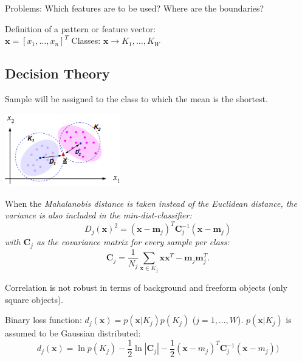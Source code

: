   \begin{minipage}{8cm}
    Problems: Which features are to be used? Where are the boundaries?
    
    Definition of a pattern or feature vector: \\
    $\bm x = [x_1, \ldots, x_n]^T$
    Classes: $\bm x \rightarrow K_1, \ldots, K_W$
  
    \subsection{Decision Theory}
        
        Sample will be assigned to the class to which the mean is the shortest. 
        
        \includegraphics[width=5cm]{./images/minimum_distance_classifier.png}
        
        When the \em Mahalanobis distance \em is taken instead of the Euclidean distance, the variance is 
        also included in the min-dist-classifier:
        $$\boxed{D_j(\bm{x})^2 = (\bm x - \bm m_j)^T \bm{C}_j^{-1} (\bm x -\bm m_j)}$$
        with $\bm C_j$ as the covariance matrix for every 
        sample per class: 
        $$\bm C_j = \frac{1}{N_j} \sum_{\bm x \in K_j} \bm x \bm x^T - \bm m_j \bm m_j^T.$$
        
        Correlation is not robust in terms of background and freeform objects (only square objects).
        
        Binary loss function: $d_j(\bm x) = p(\bm x | K_j) p(K_j)$ ($j=1,\ldots,W$).
        $p(\bm x | K_j)$ is assumed to be Gaussian distributed:      
        $$d_j(\bm x) = \ln p(K_j)  - \frac{1}{2} \ln |\bm C_j| - \frac12 (\bm x - m_j)^T \bm C_j^{-1} (\bm x - m_j)) $$
      
      
  \end{minipage} \hspace{5mm}
